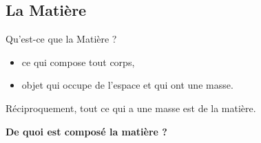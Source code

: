 \documentclass[handout,8pt]{beamer} %
\begin{document}
\subsection{La Matière}
\begin{frame}{Qu'est-ce que la Matière ?}

\begin{definition}
	\begin{itemize}
		\item ce qui compose tout corps,
		\item objet qui occupe de l'espace et qui ont une masse. 
	\end{itemize}
	Réciproquement, tout ce qui a une masse est de la matière.
\end{definition}
	
	\pause
	\begin{center}
		\textbf{De quoi est composé la matière ?}
	\end{center}
\end{frame}
\end{document}
